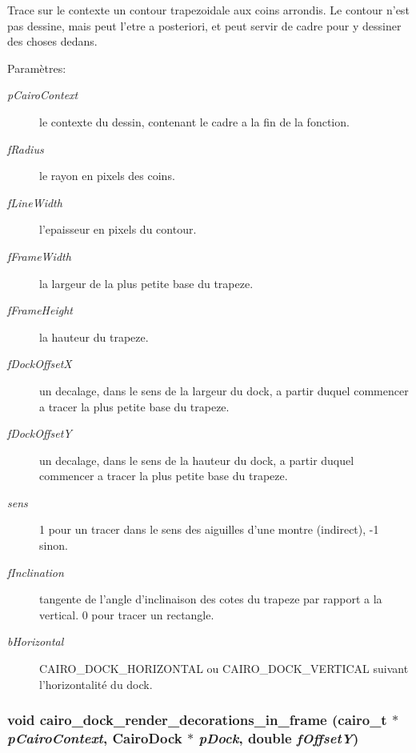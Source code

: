 Trace sur le contexte un contour trapezoidale aux coins arrondis. Le contour n'est pas dessine, mais peut l'etre a posteriori, et peut servir de cadre pour y dessiner des choses dedans. \begin{Desc}
\item[Paramètres:]
\begin{description}
\item[{\em pCairoContext}]le contexte du dessin, contenant le cadre a la fin de la fonction. \item[{\em fRadius}]le rayon en pixels des coins. \item[{\em fLineWidth}]l'epaisseur en pixels du contour. \item[{\em fFrameWidth}]la largeur de la plus petite base du trapeze. \item[{\em fFrameHeight}]la hauteur du trapeze. \item[{\em fDockOffsetX}]un decalage, dans le sens de la largeur du dock, a partir duquel commencer a tracer la plus petite base du trapeze. \item[{\em fDockOffsetY}]un decalage, dans le sens de la hauteur du dock, a partir duquel commencer a tracer la plus petite base du trapeze. \item[{\em sens}]1 pour un tracer dans le sens des aiguilles d'une montre (indirect), -1 sinon. \item[{\em fInclination}]tangente de l'angle d'inclinaison des cotes du trapeze par rapport a la vertical. 0 pour tracer un rectangle. \item[{\em bHorizontal}]CAIRO\_\-DOCK\_\-HORIZONTAL ou CAIRO\_\-DOCK\_\-VERTICAL suivant l'horizontalité du dock. \end{description}
\end{Desc}
\subsubsection{\setlength{\rightskip}{0pt plus 5cm}void cairo\_\-dock\_\-render\_\-decorations\_\-in\_\-frame (cairo\_\-t $\ast$ {\em pCairoContext}, {\bf CairoDock} $\ast$ {\em pDock}, double {\em fOffsetY})}\label{cairo-dock-draw_8h_27647a57f25f521ea768affbb88fa0f8}


